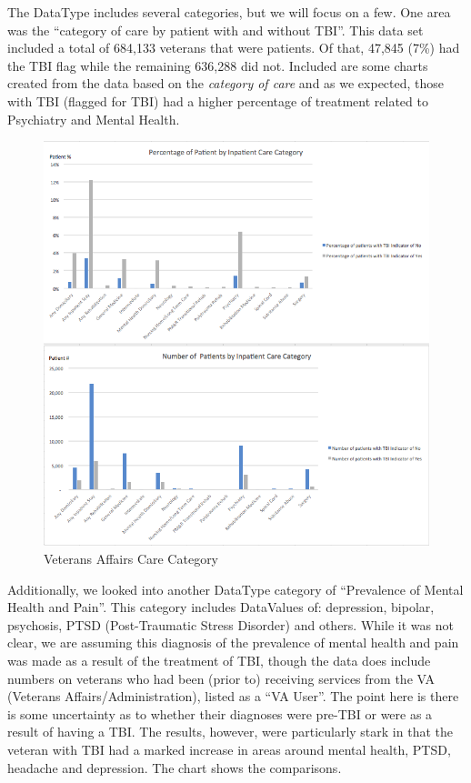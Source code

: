 \documentclass[sigconf]{acmart}
\begin{document}
The DataType includes several categories, but we will focus on a few.  One area was the ``category of care by patient with and without TBI''.  This data set included a total of 684,133 veterans that were patients.  Of that, 47,845 (7\%) had the TBI flag while the remaining 636,288 did not.  Included are some charts created from the data based on the {\em category of care} and as we expected, those with TBI (flagged for TBI) had a higher percentage of treatment related to Psychiatry and Mental Health.  

\begin{figure}[h]
\includegraphics[width=\columnwidth]{images/graph5.png}
\caption{Veterans Affairs Care Category}\label{f:Veterans Affairs Care Category}
\end{figure}

Additionally, we looked into another DataType category of  ``Prevalence of Mental Health and Pain''.  This category includes DataValues of: depression, bipolar, psychosis, PTSD (Post-Traumatic Stress Disorder) and others.  While it was not clear, we are assuming this diagnosis of the prevalence of mental health and pain was made as a result of the treatment of TBI, though the data does include numbers on veterans who had been (prior to) receiving services from the VA (Veterans Affairs/Administration), listed as a ``VA User''.  The point here is there is some uncertainty as to whether their diagnoses were pre-TBI or were as a result of having a TBI.  The results, however, were particularly stark in that the veteran with TBI had a marked increase in areas around mental health, PTSD, headache and depression.   The chart shows the comparisons.
\end{document}
